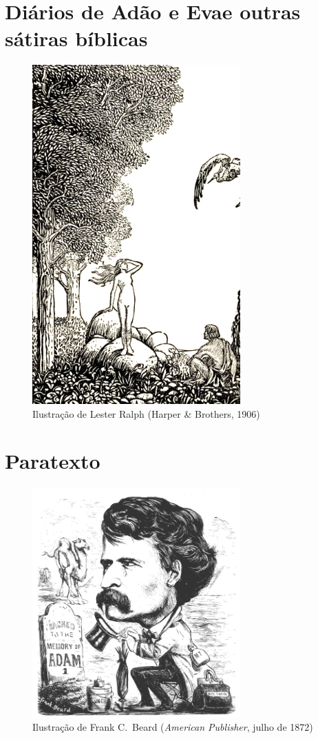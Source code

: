 \bgroup\makeatletter\def\@endpart{\vfil\newpage}
\part[Diários de Adão e Eva\\ e outras sátiras bíblicas]{Diários de Adão e Eva\break e outras sátiras bíblicas} 
\makeatother\egroup
%
\thispagestyle{empty}	
\begin{figure}\begin{center}
	\includegraphics[width=8cm]{img2.png}
	\caption{Ilustração de Lester Ralph (Harper \& Brothers, 1906)}
\end{center}\end{figure}
%

%
\part{Paratexto}
%
\thispagestyle{empty}
\begin{figure}\begin{center}
	\includegraphics[width=8cm]{img1.png}
	\caption{Ilustração de Frank C.~Beard (\emph{American Publisher}, julho de 1872)}
\end{center}\end{figure}%
%
